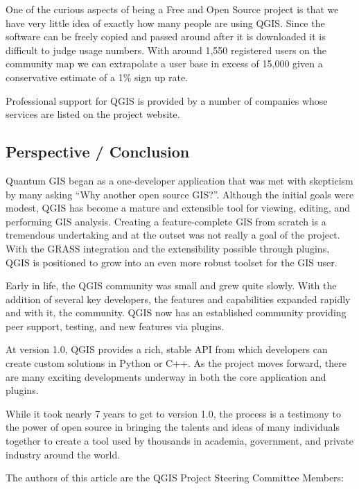 One of the curious aspects of being a Free and Open Source project is that we 
have very little idea of exactly how many people are using QGIS. Since the
software can 
be freely copied and passed around after it is downloaded it is difficult to 
judge usage numbers. With around 1,550 registered users on the community map 
we can extrapolate a user base in excess of 15,000 given a conservative 
estimate of a 1\% sign up rate.

Professional support for QGIS is provided by a number of companies whose
services are listed on the project website.

\subsection{Perspective / Conclusion}

Quantum GIS began as a one-developer application that was met with skepticism
by many asking ``Why another open source GIS?''. Although the initial goals
were modest, QGIS has become a mature and extensible tool for viewing,
editing, and performing GIS analysis. Creating a feature-complete GIS from
scratch is a tremendous undertaking and at the outset was not really a goal of
the project. With the GRASS integration and the extensibility possible through
plugins, QGIS is positioned to grow into an even more robust toolset for the
GIS user. 

Early in life, the QGIS community was small and grew quite slowly.
With the addition of several key developers, the features and capabilities
expanded rapidly and with it, the community. QGIS now has an established
community providing peer support, testing, and new features via plugins. 

At version 1.0, QGIS provides a rich, stable API from which developers can
create custom solutions in Python or C++. As the project moves forward, 
there are many exciting developments underway in both the core application and
plugins. 

While it took nearly 7 years to get to version 1.0, the process is a
testimony to the power of open source in bringing the talents and ideas of
many individuals together to create a tool used by thousands in academia,
government, and private industry around the world.


The authors of this article are the QGIS Project Steering Committee Members:

